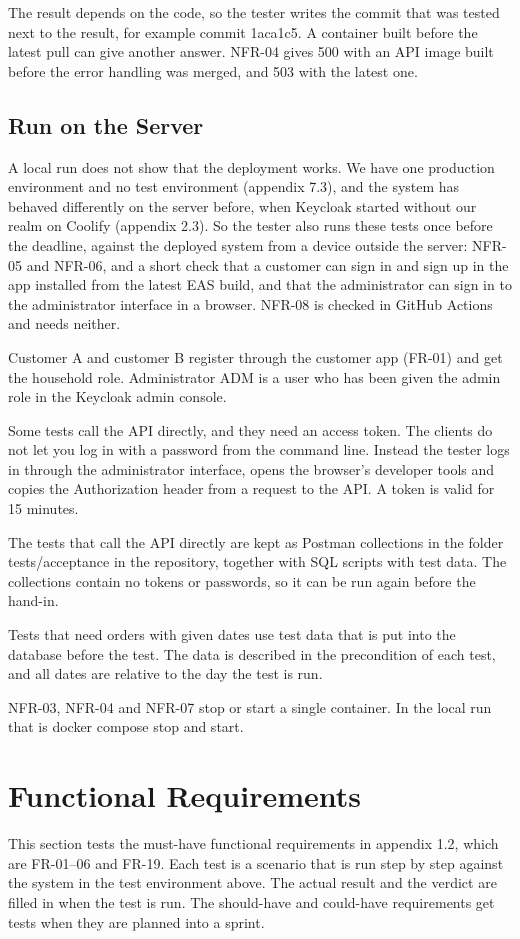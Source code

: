 \documentclass[a4paper,11pt]{article}
\begin{document}
The result depends on the code, so the tester writes the commit that was tested next to the result, for example commit 1aca1c5. A container built before the latest pull can give another answer. NFR-04 gives 500 with an API image built before the error handling was merged, and 503 with the latest one.

\subsection{Run on the Server}
A local run does not show that the deployment works. We have one production environment and no test environment (appendix 7.3), and the system has behaved differently on the server before, when Keycloak started without our realm on Coolify (appendix 2.3). So the tester also runs these tests once before the deadline, against the deployed system from a device outside the server: NFR-05 and NFR-06, and a short check that a customer can sign in and sign up in the app installed from the latest EAS build, and that the administrator can sign in to the administrator interface in a browser. NFR-08 is checked in GitHub Actions and needs neither.

Customer A and customer B register through the customer app (FR-01) and get the household role. Administrator ADM is a user who has been given the admin role in the Keycloak admin console.

Some tests call the API directly, and they need an access token. The clients do not let you log in with a password from the command line. Instead the tester logs in through the administrator interface, opens the browser's developer tools and copies the Authorization header from a request to the API. A token is valid for 15 minutes.

The tests that call the API directly are kept as Postman collections in the folder tests/acceptance in the repository, together with SQL scripts with test data. The collections contain no tokens or passwords, so it can be run again before the hand-in.

Tests that need orders with given dates use test data that is put into the database before the test. The data is described in the precondition of each test, and all dates are relative to the day the test is run.

NFR-03, NFR-04 and NFR-07 stop or start a single container. In the local run that is docker compose stop and start.

\section{Functional Requirements}
This section tests the must-have functional requirements in appendix 1.2, which are FR-01--06 and FR-19. Each test is a scenario that is run step by step against the system in the test environment above. The actual result and the verdict are filled in when the test is run. The should-have and could-have requirements get tests when they are planned into a sprint.
\end{document}
